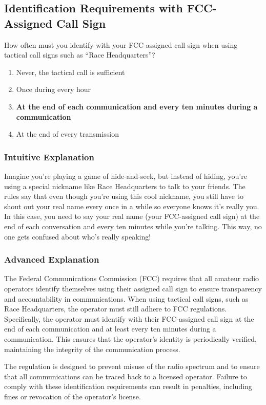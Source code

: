 \subsection{Identification Requirements with FCC-Assigned Call Sign}\label{T1F02}

\begin{tcolorbox}[colback=gray!10!white,colframe=black!75!black,title=T1F02]
How often must you identify with your FCC-assigned call sign when using tactical call signs such as “Race Headquarters”?
\begin{enumerate}[label=\Alph*)]
    \item Never, the tactical call is sufficient
    \item Once during every hour
    \item \textbf{At the end of each communication and every ten minutes during a communication}
    \item At the end of every transmission
\end{enumerate}
\end{tcolorbox}

\subsubsection{Intuitive Explanation}
Imagine you're playing a game of hide-and-seek, but instead of hiding, you're using a special nickname like Race Headquarters to talk to your friends. The rules say that even though you're using this cool nickname, you still have to shout out your real name every once in a while so everyone knows it's really you. In this case, you need to say your real name (your FCC-assigned call sign) at the end of each conversation and every ten minutes while you're talking. This way, no one gets confused about who's really speaking!

\subsubsection{Advanced Explanation}
The Federal Communications Commission (FCC) requires that all amateur radio operators identify themselves using their assigned call sign to ensure transparency and accountability in communications. When using tactical call signs, such as Race Headquarters, the operator must still adhere to FCC regulations. Specifically, the operator must identify with their FCC-assigned call sign at the end of each communication and at least every ten minutes during a communication. This ensures that the operator's identity is periodically verified, maintaining the integrity of the communication process.

The regulation is designed to prevent misuse of the radio spectrum and to ensure that all communications can be traced back to a licensed operator. Failure to comply with these identification requirements can result in penalties, including fines or revocation of the operator's license.

